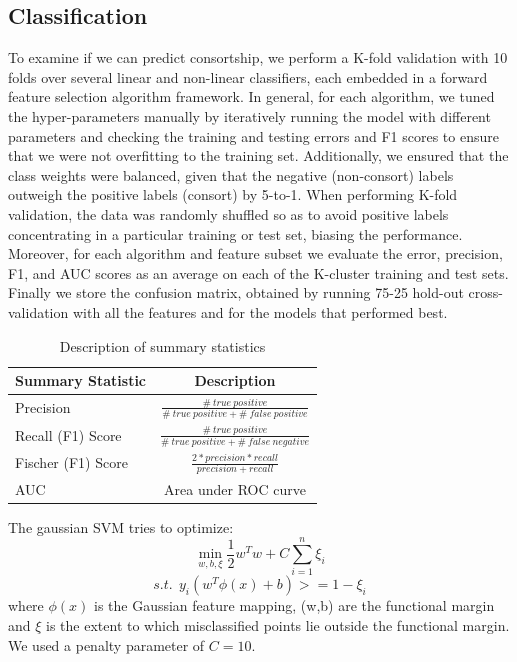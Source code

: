 \documentclass[twoside,twocolumn,paper=letter,fontsize=11pt]{article}
\begin{document}
\subsection{Classification}
To examine if we can predict consortship, we perform a K-fold validation with 10
folds over several linear and non-linear classifiers, each embedded in a forward
feature selection algorithm framework. In general, for each algorithm, we tuned
the hyper-parameters manually by iteratively running the model with different
parameters and checking the training and testing errors and F1 scores to ensure
that we were not overfitting to the training set.  Additionally, we ensured that
the class weights were balanced, given that the negative (non-consort) labels
outweigh the positive labels (consort) by 5-to-1. When performing K-fold
validation, the data was randomly shuffled so as to avoid positive labels
concentrating in a particular training or test set, biasing the performance.
Moreover, for each algorithm and feature subset we evaluate the error,
precision, F1, and AUC scores as an average on
each of the K-cluster training and test sets.  Finally we store the confusion
matrix, obtained by running 75-25 hold-out cross-validation with all the
features and for the models that performed best.
\begin{table}[h]
  \centering
  \begin{tabular}{|l|c|}
    \hline
    Summary Statistic & Description \\
    \hline
    Precision&
    $\frac{\#\ true\ positive}{\#\ true\ positive + \#\ false\ positive}$\\
    \hline
    Recall (F1) Score &
    $\frac{\#\ true\ positive}{\#\ true\ positive + \#\ false\ negative}$\\
    \hline
    Fischer (F1) Score &
    $\frac{2* precision* recall}{{precision}+{recall}}$\\
    \hline
    AUC &
    Area under ROC curve \\
    \hline
  \end{tabular}
  \caption{Description of summary statistics}
  \label{tbl:sum_stats}
\end{table}

 The gaussian SVM tries to optimize: \\
 $$ \min_{w,b,\xi} \frac{1}{2} w^Tw + C \sum_{i=1}^{n} \xi_i$$ $$ s.t. \ \  y_i(w^T\phi(x) + b) >= 1-\xi_i$$ where $\phi(x)$ is the Gaussian feature mapping, (w,b) are the functional margin and $\xi$ is the extent to which misclassified points lie outside the functional margin.
We used a penalty parameter of $C=10$.\\
\end{document}
